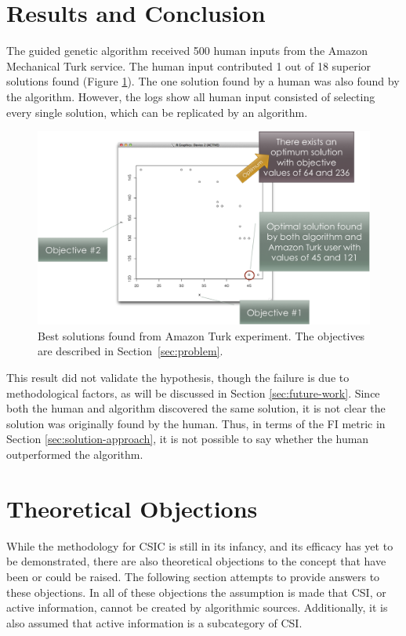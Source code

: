 \section{Results and Conclusion}
The guided genetic algorithm received 500 human inputs from the Amazon Mechanical Turk service.  The human input contributed 1 out of 18 superior solutions found (Figure \ref{fig:results}).  The one solution found by a human was also found by the algorithm.  However, the logs show all human input consisted of selecting every single solution, which can be replicated by an algorithm.

\begin{figure}[!t]
  \centering
  \includegraphics[width=4.5in]{HollowayResults}
  \caption{Best solutions found from Amazon Turk experiment.  The objectives are described in Section~\ref{sec:problem}.}
  \label{fig:results}
\end{figure}

This result did not validate the hypothesis, though the failure is  due to methodological factors, as will be discussed in Section \ref{sec:future-work}.  Since both the human and algorithm discovered the same solution, it is not clear the solution was originally found by the human.  Thus, in terms of the FI metric in Section \ref{sec:solution-approach}, it is not possible to say whether the human outperformed the algorithm.

\section{Theoretical Objections}\label{sec:objections}

While the methodology for CSIC is still in its infancy, and its efficacy has yet to be demonstrated, there are also theoretical objections to the concept that have been or could be raised.  The following section attempts to provide answers to these objections.  In all of these objections the assumption is made that CSI, or active information, cannot be created by algorithmic sources.  Additionally, it is also assumed that active information is a subcategory of CSI.

